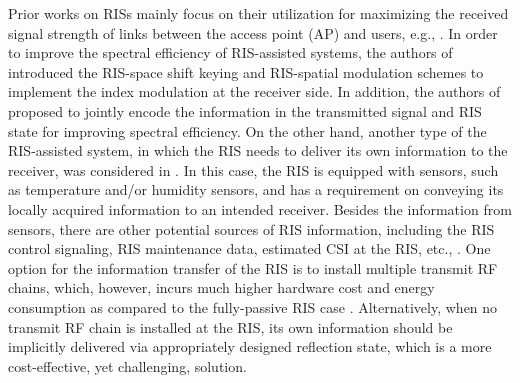 \documentclass[draftclsnofoot,onecolumn,12pt]{IEEEtran}
\newcommand{\rev}[1]{{\color{red}#1}} %
\newcommand{\revh}[1]{{\color{black}#1}} %
\newcommand{\rev}[1]{#1}
\newcommand{\revh}[1]{#1}
\begin{document}
Prior works on RISs mainly focus on their utilization for maximizing the received signal strength of links between the access point (AP) and users\revh{, e.g., \cite{Huang2020RIS}}. 
In order to improve the spectral efficiency of RIS-assisted systems, the authors of \cite{Basar2019Large} introduced the RIS-space shift keying and RIS-spatial modulation schemes to implement the index modulation at the receiver side. 
In addition, the authors of \cite{Roy2019Beyond} proposed to jointly encode the information in the transmitted signal and RIS state for improving spectral efficiency. 
On the other hand, another type of the RIS-assisted system, in which the RIS needs to deliver its own information to the receiver, was considered in \cite{renzo2019smart}. 
In this case, the RIS is equipped with sensors, such as temperature and/or humidity sensors, and
has a requirement on conveying its locally acquired information to an intended receiver. 
Besides the information from sensors, there are other potential sources of RIS information, including the RIS control signaling, RIS maintenance data, estimated CSI at the RIS, etc., \cite{Alexandropoulos2020A,yuan2020ris}. 
One option for the information transfer of the RIS is to install multiple transmit RF chains, which, however, incurs much higher hardware cost and energy consumption as compared to the fully-passive RIS case \cite{Huang2019Holographic}. Alternatively, when no transmit RF chain is installed at the RIS, its own information should be implicitly delivered via appropriately designed reflection state, which is a more cost-effective, yet challenging, solution. 
\end{document}
